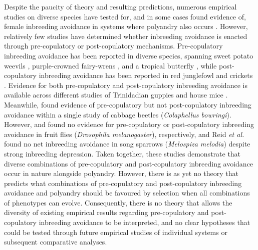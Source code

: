 \documentclass[12pt]{article}
\begin{document}
Despite the paucity of theory and resulting predictions, numerous empirical studies on diverse species have tested for, and in some cases found evidence of, female inbreeding avoidance in systems where polyandry also occurs \cite[][but see \citealt{Reid2015a}]{Tregenza2002, Varian-Ramos2012, Kingma2013, Arct2015}. However, relatively few studies have determined whether inbreeding avoidance is enacted through pre-copulatory or post-copulatory mechanisms. Pre-copulatory inbreeding avoidance has been reported in diverse species, spanning sweet potato weevils \cite[\textit{Cylas formicarius};][]{Kuriwada2011}, purple-crowned fairy-wrens \cite[\textit{Malurus coronatus};][]{Kuriwada2011}, and a tropical butterfly \cite[\textit{Bicyclus anynana};][]{Fischer2015}, while post-copulatory inbreeding avoidance has been reported in red junglefowl \cite[\textit{Gallus gallus};][]{Pizzari2004} and crickets \cite[\textit{Teleogryllus oceanicus}, \textit{Gryllus bimaculatus};][]{Simmons2006, Bretman2009}. Evidence for both pre-copulatory and post-copulatory inbreeding avoidance is available across different studies of Trinidadian guppies \cite[\textit{Poecilia reticulata};][]{Gasparini2011, Daniel2015} and house mice \cite[\textit{Mus domesticus};][]{Potts1991, Firman2015}. Meanwhile, \cite{Liu2014} found evidence of pre-copulatory but not post-copulatory inbreeding avoidance within a single study of cabbage beetles (\textit{Colaphellus bowringi}). However, \cite{Ala-Honkola2011} and \cite{Tan2012} found no evidence for pre-copulatory or post-copulatory inbreeding avoidance in fruit flies (\textit{Drosophila melanogaster}), respectively, and Reid \textit{et al.} \citeyearpar{Reid2014, Reid2015} found no net inbreeding avoidance in song sparrows (\textit{Melospiza melodia}) despite strong inbreeding depression. Taken together, these studies demonstrate that diverse combinations of pre-copulatory and post-copulatory inbreeding avoidance occur in nature alongside polyandry. However, there is as yet no theory that predicts what combinations of pre-copulatory and post-copulatory inbreeding avoidance and polyandry should be favoured by selection when all combinations of phenotypes can evolve. Consequently, there is no theory that allows the diversity of existing empirical results regarding pre-copulatory and post-copulatory inbreeding avoidance to be interpreted, and no clear hypotheses that could be tested through future empirical studies of individual systems or subsequent comparative analyses.
\end{document}
